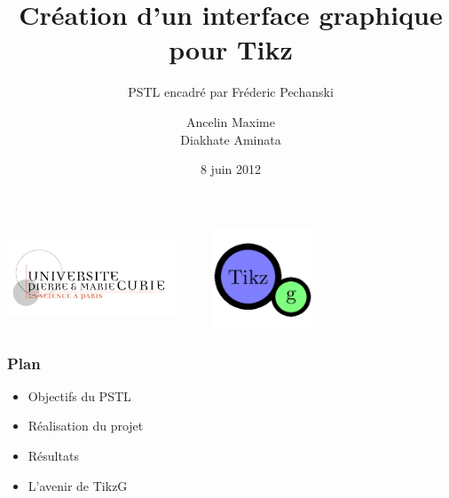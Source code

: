 \documentclass{beamer}
\title[Création d'un interface graphique pour Tikz]{Création d'un interface graphique pour Tikz}
\subtitle{PSTL encadré par Fréderic Pechanski}    %
\author[]{Ancelin Maxime\\Diakhate Aminata}                 %
\institute[UPMC]{M1 Informatique spécialité STL\\UPMC}      %
\date{8 juin 2012}      %
\begin{document}
\newenvironment{violetpar}{\color{violet}}{}
\newenvironment{bluepar}{\par\color{blue}}{\par}
\newenvironment{yellowpar}{\par\color{orange}}{\par}





\begin{frame}
  \titlepage
\includegraphics[width=5cm, height=3cm]{img/LogoUPMC.jpg} 
\includegraphics[width=5cm, height=3cm]{img/logo256.png} 
\end{frame}

\begin{frame}
\frametitle{Plan} 

\begin{itemize}

\item Objectifs du PSTL

\item Réalisation du projet

\item Résultats

\item L'avenir de TikzG

%


\end{itemize}
\end{frame}
\end{document}
